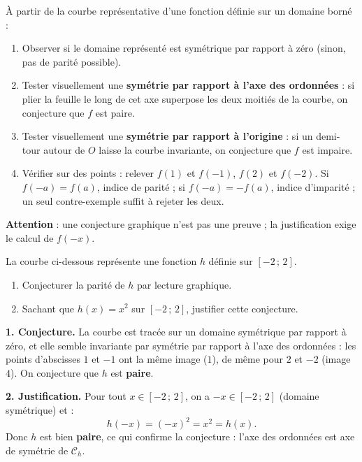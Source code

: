 \documentclass[11pt]{article}
\newcommand{\cle}[1]{{\popxbold\color{popdark}#1}}
\newcommand{\legende}[1]{\par\vspace{6pt}{\popsemi\fontsize{9}{11.5}\selectfont\color{popmuted}#1}}
\begin{document}
\begin{methode}
À partir de la courbe représentative d'une fonction définie sur un domaine borné :
\begin{enumerate}
\item Observer si le domaine représenté est symétrique par rapport à zéro (sinon, pas de parité possible).
\item Tester visuellement une \textbf{symétrie par rapport à l'axe des ordonnées} : si plier la feuille le long de cet axe superpose les deux moitiés de la courbe, on conjecture que $f$ est \cle{paire}.
\item Tester visuellement une \textbf{symétrie par rapport à l'origine} : si un demi-tour autour de $O$ laisse la courbe invariante, on conjecture que $f$ est \cle{impaire}.
\item Vérifier sur des points : relever $f(1)$ et $f(-1)$, $f(2)$ et $f(-2)$. Si $f(-a)=f(a)$, indice de parité ; si $f(-a)=-f(a)$, indice d'imparité ; un seul contre-exemple suffit à rejeter les deux.
\end{enumerate}
\textbf{Attention} : une conjecture graphique n'est pas une preuve ; la justification exige le calcul de $f(-x)$.
\end{methode}

\begin{exoresolu}
La courbe ci-dessous représente une fonction $h$ définie sur $[-2\,;\,2]$.
\begin{popfigure}
\legende{Courbe de la fonction $h(x)=x^2$ sur $[-2;2]$.}
\end{popfigure}
\begin{enumerate}
\item Conjecturer la parité de $h$ par lecture graphique.
\item Sachant que $h(x)=x^2$ sur $[-2\,;\,2]$, justifier cette conjecture.
\end{enumerate}
\tcblower
\textbf{1. Conjecture.} La courbe est tracée sur un domaine symétrique par rapport à zéro, et elle semble invariante par symétrie par rapport à l'axe des ordonnées : les points d'abscisses $1$ et $-1$ ont la même image ($1$), de même pour $2$ et $-2$ (image $4$). On conjecture que $h$ est \textbf{paire}.

\textbf{2. Justification.} Pour tout $x\in[-2\,;\,2]$, on a $-x\in[-2\,;\,2]$ (domaine symétrique) et :
\[ h(-x)=(-x)^2=x^2=h(x). \]
Donc $h$ est bien \textbf{paire}, ce qui confirme la conjecture : l'axe des ordonnées est axe de symétrie de $\mathscr{C}_h$.
\end{exoresolu}
\end{document}
